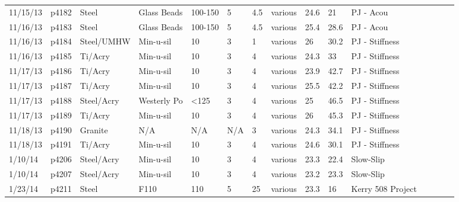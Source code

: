 \begin{landscape}
\begin{longtable} {lllllllllllllll}
11/15/13 & p4182      & Steel            & Glass Beads  & 100-150      & 5         & 4.5           & various                      & 24.6        & 21       & PJ - Acou\\
11/16/13 & p4183      & Steel            & Glass Beads  & 100-150      & 5         & 4.5           & various                      & 25.4        & 28.6     & PJ - Acou\\
11/16/13 & p4184      & Steel/UMHW       & Min-u-sil    & 10           & 3         & 1             & various                      & 26          & 30.2     & PJ - Stiffness\\
11/16/13 & p4185      & Ti/Acry & Min-u-sil    & 10           & 3         & 4             & various                      & 24.3        & 33       & PJ - Stiffness\\
11/17/13 & p4186      & Ti/Acry & Min-u-sil    & 10           & 3         & 4             & various                      & 23.9        & 42.7     & PJ - Stiffness\\
11/17/13 & p4187      & Ti/Acry & Min-u-sil    & 10           & 3         & 4             & various                      & 25.5        & 42.2     & PJ - Stiffness\\
11/17/13 & p4188      & Steel/Acry    & Westerly Po  & \textless125 & 3         & 4             & various                      & 25          & 46.5     & PJ - Stiffness\\
11/17/13 & p4189      & Ti/Acry & Min-u-sil    & 10           & 3         & 4             & various                      & 26          & 45.3     & PJ - Stiffness\\
11/18/13 & p4190      & Granite          & N/A          & N/A          & N/A       & 3             & various                      & 24.3        & 34.1     & PJ - Stiffness\\
11/18/13 & p4191      & Ti/Acry & Min-u-sil    & 10           & 3         & 4             & various                      & 24.6        & 30.1     & PJ - Stiffness\\
1/10/14  & p4206      & Steel/Acry    & Min-u-sil    & 10           & 3         & 4             & various                      & 23.3        & 22.4     & Slow-Slip\\
1/10/14  & p4207      & Steel/Acry    & Min-u-sil    & 10           & 3         & 4             & various                      & 23.2        & 23.3     & Slow-Slip\\
1/23/14  & p4211      & Steel            & F110         & 110          & 5         & 25            & various                      & 23.3        & 16       & Kerry 508 Project\\

\end{longtable}
\end{landscape}
